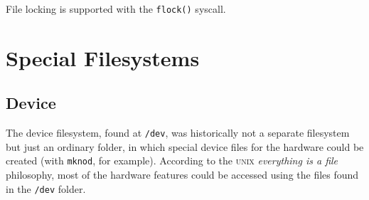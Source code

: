 \documentclass[a4paper]{article}
\begin{document}
File locking is supported with the \verb|flock()| syscall.


\section{Special Filesystems}


\subsection{Device}


The device filesystem, found at \verb|/dev|, was historically not a separate filesystem but just an ordinary folder, in which special device files for the hardware could be created (with \verb|mknod|, for example). According to the \textsc{unix} \emph{everything is a file} philosophy, most of the hardware features could be accessed using the files found in the \verb|/dev| folder.
\end{document}
